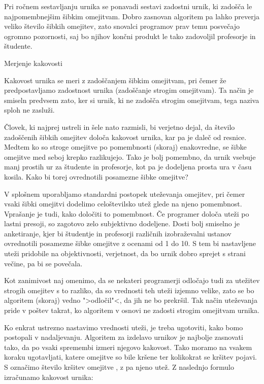 \documentclass[10pt,a4paper]{article}
\begin{document}
Pri ročnem sestavljanju urnika se ponavadi sestavi zadostni urnik, ki zadošča le
najpomembnejšim šibkim omejitvam. Dobro zasnovan algoritem pa lahko preverja veliko
število šibkih omejitev, zato snovalci programov prav temu posvečajo ogromno pozornosti,
saj bo njihov končni produkt le tako zadovoljil profesorje in študente.

Merjenje kakovosti %

Kakovost urnika se meri z zadoščanjem šibkim omejitvam, pri čemer že predpostavljamo
zadostnost urnika (zadoščanje strogim omejitvam). Ta način je smiseln predvsem zato,
ker si urnik, ki ne zadošča strogim omejitvam, tega naziva sploh ne zasluži.

Človek, ki najprej ustreli in šele nato razmisli, bi verjetno dejal, da število
zadoščenih šibkih omejitev določa kakovost urnika, kar pa je daleč od resnice. Medtem
ko so stroge omejitve po pomembnosti (skoraj) enakovredne, se šibke omejitve med seboj
krepko razlikujejo. Tako je bolj pomembno, da urnik vsebuje manj prostih ur za
študente in profesorje, kot pa je dodeljena prosta ura v času kosila. Kako bi torej
ovrednotili posamezne šibke omejitve?

V splošnem uporabljamo standardni postopek uteževanja omejitev, pri čemer vsaki šibki
omejitvi dodelimo celoštevilsko utež glede na njeno pomembnost. Vprašanje je tudi, kako
določiti to pomembnost. Če programer določa uteži po lastni presoji, so zagotovo zelo
subjektivno dodeljene. Dosti bolj smiselno je anketiranje, kjer bi študentje in profesorji
različnih izobraževalni ustanov ovrednotili posamezne šibke omejitve z ocenami od 1 do 10.
S tem bi nastavljene uteži pridobile na objektivnosti, verjetnost, da bo urnik dobro
sprejet s strani večine, pa bi se povečala.

Kot zanimivost naj omenimo, da se nekateri programerji odločajo tudi za utežitev strogih
omejitev s to razliko, da so vrednosti teh uteži izjemno velike, zato se bo algoritem
(skoraj) vedno ">odločil"<, da jih ne bo prekršil. Tak način uteževanja pride v poštev
takrat, ko algoritem v osnovi ne zadosti strogim omejitvam urnika.

Ko enkrat ustrezno nastavimo vrednosti uteži, je treba ugotoviti, kako bomo postopali
v nadaljevanju. Algoritem za izdelavo urnikov je najbolje zasnovati tako, da po vsaki
spremembi izmeri njegovo kakovost. Tako moramo na vsakem koraku ugotavljati, katere
omejitve so bile kršene ter kolikokrat se kršitev pojavi. S  označimo število
kršitev omejitve , z  pa njeno utež. Z naslednjo formulo izračunamo
kakovost urnika:
\end{document}
